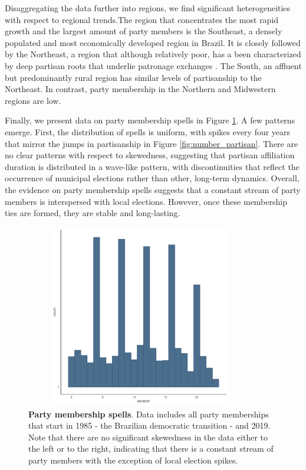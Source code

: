\documentclass[12pt,a4paper]{article}
\begin{document}
Disaggregating the data further into regions, we find significant heterogeneities with respect to regional trends.The region that concentrates the most rapid growth and the largest amount of party members is the Southeast, a densely populated and most economically developed region in Brazil. It is closely followed by the Northeast, a region that although relatively poor, has a been characterized by deep partisan roots that underlie patronage exchanges \citep{ansell2010auctioning}. The South, an affluent but predominantly rural region has similar levels of partisanship to the Northeast. In contrast, party membership in the Northern and Midwestern regions are low.

Finally, we present data on party membership spells in Figure \ref{fig:party_spell}. A few patterns emerge. First, the distribution of spells is uniform, with spikes every four years that mirror the jumps in partisanship in Figure \ref{fig:number_partisan}. There are no clear patterns with respect to skewedness, suggesting that partisan affiliation duration is distributed in a wave-like pattern, with discontinuities that reflect the occurrence of municipal elections rather than other, long-term dynamics. Overall, the evidence on party membership spells suggests that a constant stream of party members is interspersed with local elections. However, once these membership ties are formed, they are stable and long-lasting.

\begin{figure}
    \centering
    \includegraphics[width = 10cm, height = 8cm]{figures/partisanship/plot_partisan_spell.pdf}
    \caption{\textbf{Party membership spells}. Data includes all party memberships that start in 1985 - the Brazilian democratic transition - and 2019. Note that there are no significant skewedness in the data either to the left or to the right, indicating that there is a constant stream of party members with the exception of local election spikes.}
    \label{fig:party_spell}
\end{figure}
\end{document}

